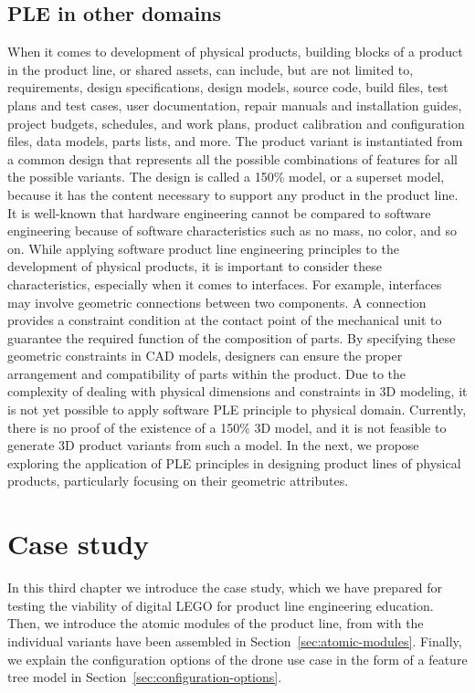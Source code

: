 \documentclass[sigconf,review]{acmart}
\begin{document}
\subsection{PLE in other domains}
\label{sec:ple-other}

When it comes to development of physical products, building blocks of a product in the product line, or shared assets, can include, but are not limited to, requirements, design specifications, design models, source code, build files, test plans and test cases, user documentation, repair manuals and installation guides, project budgets, schedules, and work plans, product calibration and configuration files, data models, parts lists, and more. 
The product variant is instantiated from a common design that represents all the possible combinations of features for all the possible variants. The design is called a 150\% model, or a superset model, because it has the content necessary to support any product in the product line. 
It is well-known that hardware engineering cannot be compared to software engineering because of software characteristics such as no mass, no color, and so on.
While applying software product line engineering principles to the development of physical products, it is important to consider these characteristics, especially when it comes to interfaces. 
For example, interfaces may involve geometric connections between two components.  
A connection provides a constraint condition at the contact point of the mechanical unit to guarantee the required function of the composition of parts. 
By specifying these geometric constraints in CAD models, designers can ensure the proper arrangement and compatibility of parts within the product.
Due to the complexity of dealing with physical dimensions and constraints in 3D modeling, it is not yet possible to apply software PLE principle to physical domain.  Currently, there is no proof of the existence of a 150\% 3D model, and it is not feasible to generate 3D product variants from such a model. In the next, we propose exploring the application of PLE principles in designing product lines of physical products, particularly focusing on their geometric attributes.


\section{Case study}
\label{sec:case-study}

In this third chapter we introduce the case study, which we have prepared for testing the viability of digital LEGO for product line engineering education.
Then, we introduce the atomic modules of the product line, from with the individual variants have been assembled in Section~\ref{sec:atomic-modules}.
Finally, we explain the configuration options of the drone use case in the form of a feature tree model in Section~\ref{sec:configuration-options}.
\end{document}
